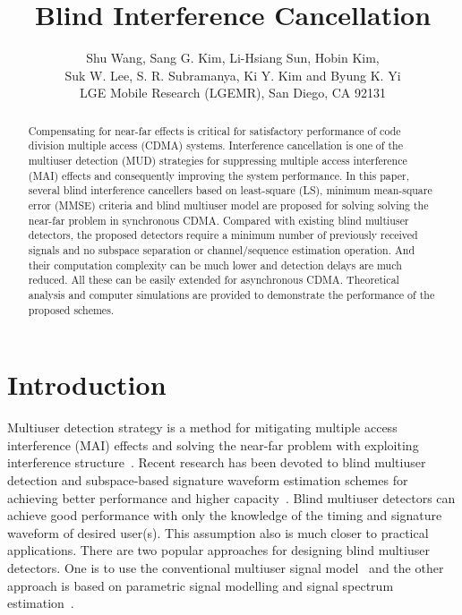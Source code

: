 \documentclass[a4paper,10pt,fleqn, twocolumn]{IEEETran}
\title{Blind Interference Cancellation}
\author{Shu Wang, Sang G. Kim, Li-Hsiang Sun, Hobin Kim,\\
   Suk W. Lee, S. R. Subramanya, Ki Y. Kim and Byung K. Yi\\ LGE Mobile Research (LGEMR), San Diego, CA 92131}
\date{}
\begin{document}
\maketitle
\begin{abstract}\small
Compensating for near-far effects is critical for satisfactory
performance of code division multiple access (CDMA) systems.
Interference cancellation is one of the multiuser detection (MUD)
strategies for suppressing multiple access interference (MAI)
effects and consequently improving the system performance. In this
paper, several blind interference cancellers based on least-square
(LS), minimum mean-square error (MMSE) criteria and blind
multiuser model are proposed for solving solving the near-far
problem in synchronous CDMA. Compared with existing blind
multiuser detectors, the proposed detectors require a minimum
number of previously received signals and no subspace separation
or channel/sequence estimation operation. And their computation
complexity can be much lower and detection delays are much
reduced. All these can be easily extended for asynchronous CDMA.
Theoretical analysis and computer simulations are provided to
demonstrate the performance of the proposed schemes.
\end{abstract}
\section{Introduction}
Multiuser detection strategy is a method for mitigating multiple
access interference (MAI) effects and solving the near-far problem
with exploiting interference structure~\cite{Verd98}. Recent
research has been devoted to blind multiuser detection and
subspace-based signature waveform estimation schemes for achieving
better performance and higher
capacity~\cite{Madh94,Honi95,Torl97,Wang98,Wang99,Zhang02}. Blind
multiuser detectors can achieve good performance with only the
knowledge of the timing and signature waveform of desired user(s).
This assumption also is much closer to practical applications.
There are two popular approaches for designing blind multiuser
detectors. One is to use the conventional multiuser signal
model~\cite{Verd98,Madh94,Honi95,Zhang02} and the other approach
is based on parametric signal modelling and signal spectrum
estimation~\cite{Wang98,Wang99}.
\end{document}
